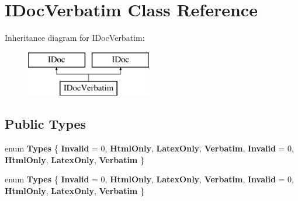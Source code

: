 \hypertarget{class_i_doc_verbatim}{}\section{I\+Doc\+Verbatim Class Reference}
\label{class_i_doc_verbatim}
Inheritance diagram for I\+Doc\+Verbatim\+:\begin{figure}[H]
\begin{center}
\leavevmode
\includegraphics[height=2.000000cm]{class_i_doc_verbatim}
\end{center}
\end{figure}
\subsection*{Public Types}
\begin{DoxyCompactItemize}
\item 
\mbox{\label{class_i_doc_verbatim_a580f5967906a7f65e90fadfc3f852c13}} 
enum {\bfseries Types} \{ \newline
{\bfseries Invalid} = 0, 
{\bfseries Html\+Only}, 
{\bfseries Latex\+Only}, 
{\bfseries Verbatim}, 
\newline
{\bfseries Invalid} = 0, 
{\bfseries Html\+Only}, 
{\bfseries Latex\+Only}, 
{\bfseries Verbatim}
 \}
\item 
\mbox{\label{class_i_doc_verbatim_a580f5967906a7f65e90fadfc3f852c13}} 
enum {\bfseries Types} \{ \newline
{\bfseries Invalid} = 0, 
{\bfseries Html\+Only}, 
{\bfseries Latex\+Only}, 
{\bfseries Verbatim}, 
\newline
{\bfseries Invalid} = 0, 
{\bfseries Html\+Only}, 
{\bfseries Latex\+Only}, 
{\bfseries Verbatim}
 \}
\end{DoxyCompactItemize}
